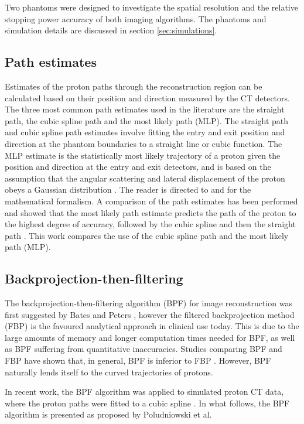 \documentclass[11pt,a4paper]{article}
\begin{document}
Two phantoms were designed to investigate the spatial resolution and the relative stopping power accuracy of both imaging algorithms. The phantoms and simulation details are discussed in section \ref{sec:simulations}.

\subsection{Path estimates}
\label{sec:pathestimates}
Estimates of the proton paths through the reconstruction region can be calculated based on their position and direction measured by the CT detectors. The three most common path estimates used in the literature are the straight path, the cubic spline path and the most likely path (MLP). The straight path and cubic spline path estimates involve fitting the entry and exit position and direction at the phantom boundaries to a straight line or cubic function. The MLP estimate is the statistically most likely trajectory of a proton given the position and direction at the entry and exit detectors, and is based on the assumption that the angular scattering and lateral displacement of the proton obeys a Gaussian distribution \parencite{eyges1948multiple}. The reader is directed to \parencite{schulte2008maximum} and \parencite{williams2004most} for the mathematical formalism. A comparison of the path estimates has been performed and showed that the most likely path estimate predicts the path of the proton to the highest degree of accuracy, followed by the cubic spline and then the straight path \parencite{li2006reconstruction}. This work compares the use of the cubic spline path and the most likely path (MLP).


\subsection{Backprojection-then-filtering}
\label{sec:BPF}
The backprojection-then-filtering algorithm (BPF) for image reconstruction was first suggested by Bates and Peters \parencite{bates1971towards}, however the filtered backprojection method (FBP) is the favoured analytical approach in clinical use today. This is due to the large amounts of memory and longer computation times needed for BPF, as well as BPF suffering from quantitative inaccuracies. Studies comparing BPF and FBP have shown that, in general, BPF is inferior to FBP \parencite{suzuki1988comparison}. However, BPF naturally lends itself to the curved trajectories of protons. 

In recent work, the BPF algorithm was applied to simulated proton CT data, where the proton paths were fitted to a cubic spline \parencite{poludniowski2014proton}. In what follows, the BPF algorithm is presented as proposed by Poludniowski et al.
\end{document}
